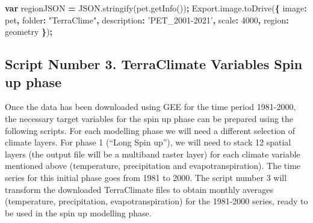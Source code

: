 \documentclass[
  10pt,
  b5paper,
]{book}
\newenvironment{Shaded}{\begin{snugshade}}{\end{snugshade}}
\newcommand{\AttributeTok}[1]{\textcolor[rgb]{0.77,0.63,0.00}{#1}}
\newcommand{\DataTypeTok}[1]{\textcolor[rgb]{0.13,0.29,0.53}{#1}}
\newcommand{\DecValTok}[1]{\textcolor[rgb]{0.00,0.00,0.81}{#1}}
\newcommand{\KeywordTok}[1]{\textcolor[rgb]{0.13,0.29,0.53}{\textbf{#1}}}
\newcommand{\NormalTok}[1]{#1}
\newcommand{\OperatorTok}[1]{\textcolor[rgb]{0.81,0.36,0.00}{\textbf{#1}}}
\newcommand{\StringTok}[1]{\textcolor[rgb]{0.31,0.60,0.02}{#1}}
\newcommand{\VariableTok}[1]{\textcolor[rgb]{0.00,0.00,0.00}{#1}}
\begin{document}
\begin{Shaded}
\begin{Highlighting}[]
\KeywordTok{var}\NormalTok{ regionJSON }\OperatorTok{=} \VariableTok{JSON}\NormalTok{.}\AttributeTok{stringify}\NormalTok{(}\VariableTok{pet}\NormalTok{.}\AttributeTok{getInfo}\NormalTok{())}\OperatorTok{;}
\VariableTok{Export}\NormalTok{.}\VariableTok{image}\NormalTok{.}\AttributeTok{toDrive}\NormalTok{(}\OperatorTok{\{}
          \DataTypeTok{image}\OperatorTok{:}\NormalTok{ pet}\OperatorTok{,}
          \DataTypeTok{folder}\OperatorTok{:} \StringTok{"TerraClime"}\OperatorTok{,}
          \DataTypeTok{description}\OperatorTok{:} \StringTok{'PET_2001-2021'}\OperatorTok{,} 
          \DataTypeTok{scale}\OperatorTok{:} \DecValTok{4000}\OperatorTok{,}
          \DataTypeTok{region}\OperatorTok{:}\NormalTok{ geometry}
\OperatorTok{\}}\NormalTok{)}\OperatorTok{;}
\end{Highlighting}
\end{Shaded}

\hypertarget{script-number-3.-terraclimate-variables-spin-up-phase}{%
\subsection{Script Number 3. TerraClimate Variables Spin up phase}\label{script-number-3.-terraclimate-variables-spin-up-phase}}

Once the data has been downloaded using GEE for the time period 1981-2000, the necessary target variables for the spin up phase can be prepared using the following scripts. For each modelling phase we will need a different selection of climate layers. For phase 1 (``Long Spin up''), we will need to stack 12 spatial layers (the output file will be a multiband raster layer) for each climate variable mentioned above (temperature, precipitation and evapotranspiration). The time series for this initial phase goes from 1981 to 2000. The script number 3 will transform the downloaded TerraClimate files to obtain monthly averages (temperature, precipitation, evapotranspiration) for the 1981-2000 series, ready to be used in the spin up modelling phase.
\end{document}
